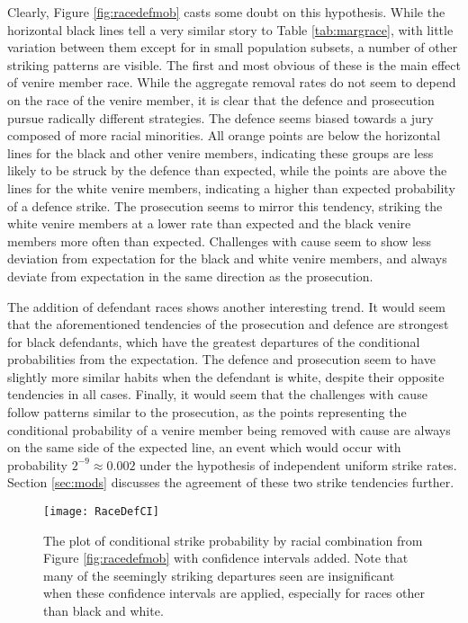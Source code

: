 Clearly, Figure \ref{fig:racedefmob} casts some doubt on this hypothesis. While the horizontal black lines tell a very similar
story to Table \ref{tab:margrace}, with little variation between them except for in small population subsets, a number of other
striking patterns are visible. The first and most obvious of these is the main effect of venire member race. While the aggregate
removal rates do not seem to depend on the race of the venire member, it is clear that the defence and prosecution pursue
radically different strategies. The defence seems biased towards a jury composed of more racial minorities. All
orange points are below the horizontal lines for the black and other venire members, indicating these groups are less likely to be
struck by the defence than expected, while the points are above the lines for the white venire members, indicating a higher than
expected probability of a defence strike. The prosecution seems to mirror this tendency, striking the
white venire members at a lower rate than expected and the black venire members more often than expected. Challenges with cause
seem to show less deviation from expectation for the black and white venire members, and always deviate from expectation
in the same direction as the prosecution.

The addition of defendant races shows another interesting trend. It would seem that the aforementioned tendencies of the
prosecution and defence are strongest for black defendants, which have the greatest departures of the conditional probabilities
from the expectation. The defence and prosecution seem to have slightly more similar habits when the defendant is white, despite
their opposite tendencies in all cases. Finally, it would seem that the challenges with cause follow patterns similar to the
prosecution, as the points representing the conditional probability of a venire member being removed with cause are always on the
same side of the expected line, an event which would occur with probability $2^{-9} \approx 0.002$ under the hypothesis of
independent uniform strike rates. Section \ref{sec:mods} discusses the agreement of these two strike tendencies further.

\begin{figure}[h!]
  \centering
  \texttt{[image: RaceDefCI]}
  \caption[Strikes by Racial Combination with Confidence
  Intervals (Sunsine)]{\footnotesize The plot of conditional strike probability by racial
    combination from Figure \ref{fig:racedefmob} with confidence intervals added. Note that many of the seemingly striking departures seen are
    insignificant when these confidence intervals are applied,
    especially for races other than black and white.}
  \label{fig:racedefci}
\end{figure}

